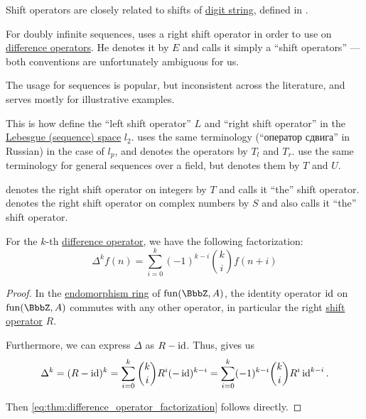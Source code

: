 \begin{comments}
  \item Shift operators are closely related to shifts of \hyperref[def:positional_number_system]{digit string}, defined in .

  \item For doubly infinite sequences,  uses a right shift operator in order to use  on \hyperref[def:difference_operator]{difference operators}. He denotes it by \( E \) and calls it simply a \enquote{shift operators} --- both conventions are unfortunately ambiguous for us.

  The usage for sequences is popular, but inconsistent across the literature, and serves mostly for illustrative examples.

  This is how  define the \enquote{left shift operator} \( L \) and \enquote{right shift operator} in the \hyperref[def:lebesgue_space]{Lebesgue (sequence) space} \( l_2 \).  uses the same terminology (\enquote{оператор сдвига} in Russian) in the case of \( l_p \), and denotes the operators by \( T_l \) and \( T_r \).  use the same terminology for general sequences over a field, but denotes them by \( T \) and \( U \).

   denotes the right shift operator on integers by \( T \) and calls it \enquote{the} shift operator.  denotes the right shift operator on complex numbers by \( S \) and also calls it \enquote{the} shift operator.
\end{comments}

\begin{proposition}\label{thm:difference_operator_factorization}
  For the \( k \)-th \hyperref[def:difference_operator]{difference operator}, we have the following factorization:
  \begin{equation}\label{eq:thm:difference_operator_factorization}
    \Delta^k f(n) = \sum_{i=0}^k (-1)^{k-i} \binom k i f(n + i)
  \end{equation}
\end{proposition}
\begin{proof}
  In the \hyperref[def:endomorphism_ring]{endomorphism ring} of \( \fun(\BbbZ, A) \), the identity operator \( \operatorname{id} \) on \( \fun(\BbbZ, A) \) commutes with any other operator, in particular the right \hyperref[def:shift_operator]{shift operator} \( R \).

  Furthermore, we can express \( \Delta \) as \( R - \operatorname{id} \). Thus,  gives us
  \begin{equation*}
    \Delta^k
    =
    (R - \operatorname{id})^k
    =
    \sum_{i=0}^k \binom k i R^i (-\operatorname{id})^{k-i}
    =
    \sum_{i=0}^k (-1)^{k-i} \binom k i R^i \operatorname{id}^{k-i}.
  \end{equation*}

  Then \eqref{eq:thm:difference_operator_factorization} follows directly.
\end{proof}
